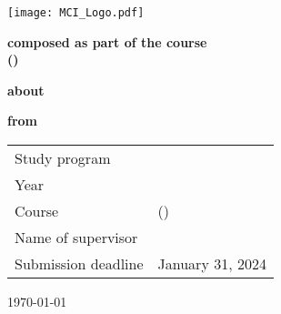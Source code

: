 
\thispagestyle{empty}
\thispdfpagelabel{} %
\begin{center}
	\textbf{\Huge \university}\par
	\vspace{8ex}\par
	\textbf{\LARGE \department}\par
	\vspace{4ex}\par
	\textbf{\Large \studyProgram}\par
	\vspace{4ex}\par
	\texttt{[image: MCI\_Logo.pdf]}\par
	\vspace{4ex}\par
	\textbf{\LARGE \docType}\par
	\vspace{2ex}\par
	\textbf{composed as part of the course\\[0.5ex] \courseName{} (\courseCode)}\par
	\vspace{4ex}\par
	\textbf{about}\par
	\vspace{4ex}\par
	\textbf{\LARGE \docTitle}\par
	\vspace{4ex}\par
	\textbf{from}\par
	\vspace{4ex}\par
	\textbf{\Large \href{\authorContact}{\authorName}}
\end{center}
\vspace{4ex}
\begin{tabular}{ll}
	Study program & \studyProgram\\[0.5ex]
	Year & \studyYear\\[0.5ex]
	Course & \courseName{} (\courseCode)\\[0.5ex]
	Name of supervisor & \href{\lecturerContact}{\supervisorName}\\[0.5ex]
	Submission deadline & January 31, 2024
\end{tabular}
\vfill
\begin{center}
	\today
\end{center}
